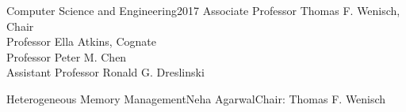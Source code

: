 \documentclass[reqno,12pt,oneside]{report} %
\theoremstyle{plain}
\theoremstyle{definition}
\theoremstyle{remark}
\numberwithin{theorem}{chapter}     %
\begin{document}

{Computer Science and Engineering}{2017}
{Associate Professor Thomas F. Wenisch, Chair\\
 Professor Ella Atkins, Cognate\\
 Professor Peter M. Chen\\
 Assistant Professor Ronald G. Dreslinski}

\initializefrontsections



\makeatletter
\if@twoside \setcounter{page}{4} \else \setcounter{page}{1} \fi
\makeatother
 

\startacknowledgementspage

\label{Acknowledgements}

%

\tableofcontents     %
\listoffigures       %
\listoftables        %

\startabstractpage
{Heterogeneous Memory Management}{Neha Agarwal}{Chair: Thomas F. Wenisch}

\label{abstract}
\end{document}
